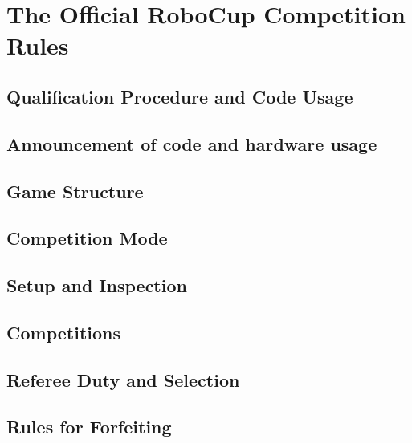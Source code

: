 \section{The Official RoboCup Competition Rules}
\label{sec:robocup_rules}

\subsection{Qualification Procedure and Code Usage}
\label{sec:qualification}

\subsection{Announcement of code and hardware usage}
\label{sec:code_and_hardware}

\subsection{Game Structure}
\label{sec:game_structure}

\subsection{Competition Mode}
\label{sec:competition_mode}

\subsection{Setup and Inspection}
\label{sec:setup_and_inspection}

\subsection{Competitions}
\label{sec:competitions}


\subsection{Referee Duty and Selection}
\label{sec:referee_duty}

\subsection{Rules for Forfeiting}
\label{sec:forfeit}

